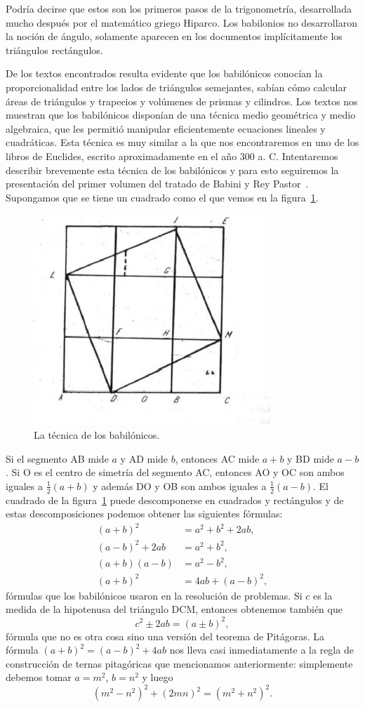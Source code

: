 Podría decirse que estos son los primeros pasos de la trigonometría,
desarrollada mucho después por el matemático griego Hiparco.  Los babilonios no
desarrollaron la noción de ángulo, solamente aparecen en los documentos
implícitamente los triángulos rectángulos. 

De los textos encontrados resulta evidente que los babilónicos conocían la
proporcionalidad entre los lados de triángulos semejantes, sabían cómo calcular
áreas de triángulos y trapecios y volúmenes de prismas y cilindros. Los textos
nos muestran que los babilónicos disponían de una técnica medio geométrica y
medio algebraica, que les permitió manipular eficientemente ecuaciones lineales
y cuadráticas. Esta técnica es muy similar a la que nos encontraremos en uno de
los libros de Euclides, escrito aproximadamente en el año 300 a. C.
Intentaremos describir brevemente esta técnica de los babilónicos y para esto
seguiremos la presentación del primer volumen del tratado de Babini y Rey
Pastor~\cite{BabiniReyPastor1,BabiniReyPastor2}.  Supongamos que se tiene un
cuadrado como el que vemos en la figura~\ref{fig:babilonios}. 
\begin{figure}
   \centering
   \includegraphics[scale=0.4]{images/babilonios}
   \caption{La técnica de los babilónicos.}
   \label{fig:babilonios}
\end{figure}
Si el segmento AB mide $a$ y AD mide $b$, entonces AC mide $a+b$ y BD mide
$a-b$. Si O es el centro de simetría del segmento AC, entonces AO y OC son
ambos iguales a $\frac12(a+b)$ y además DO y OB son ambos iguales a
$\frac12(a-b)$. El cuadrado de la figura~\ref{fig:babilonios} puede
descomponerse en cuadrados y rectángulos y de estas descomposiciones podemos
obtener las siguientes fórmulas:
\begin{align*}
	(a+b)^2 &= a^2+b^2+2ab,\\
	(a-b)^2+2ab &= a^2 + b^2,\\
	(a+b)(a-b) &= a^2-b^2,\\
	(a+b)^2 &= 4ab+(a-b)^2,
\end{align*}
fórmulas que los babilónicos usaron en la resolución de problemas. Si $c$ es la medida de la hipotenusa del triángulo
DCM, entonces obtenemos también que 
\[
	c^2\pm 2ab=(a\pm b)^2,
\]
fórmula que no es otra cosa sino una versión del teorema de Pitágoras. La
fórmula $(a+b)^2=(a-b)^2+4ab$ nos lleva casi inmediatamente a la regla de
construcción de ternas pitagóricas que mencionamos anteriormente: simplemente
debemos tomar $a=m^2$, $b=n^2$ y luego 
\[
	(m^2-n^2)^2+(2mn)^2=(m^2+n^2)^2.
\]


